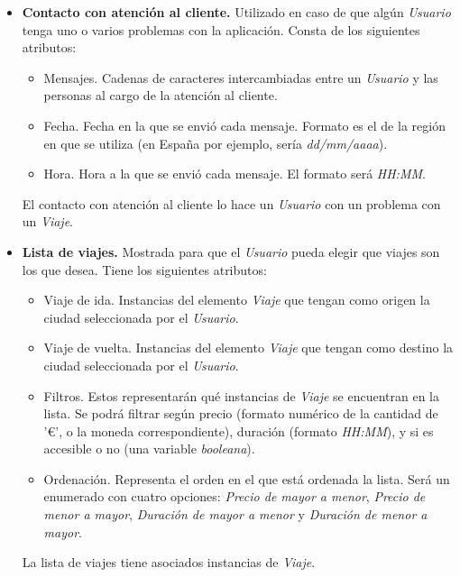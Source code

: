 \begin{itemize}
    \item \textbf{Contacto con atención al cliente.} Utilizado en caso de que algún \textit{Usuario} tenga uno o varios problemas con la aplicación. Consta
        de los siguientes atributos:
        \begin{itemize}
            \item Mensajes. Cadenas de caracteres intercambiadas entre un \textit{Usuario} y las personas al cargo de la atención al cliente.
            \item Fecha. Fecha en la que se envió cada mensaje. Formato es el de la región en que se utiliza (en España por ejemplo,
                sería \textit{dd/mm/aaaa}).
            \item Hora. Hora a la que se envió cada mensaje. El formato será \textit{HH:MM}.
        \end{itemize}

        El contacto con atención al cliente lo hace un \textit{Usuario} con un problema con un \textit{Viaje}.

    \item \textbf{Lista de viajes.} Mostrada para que el \textit{Usuario} pueda elegir que viajes son los que desea. Tiene los siguientes atributos:
        \begin{itemize}
            \item Viaje de ida. Instancias del elemento \textit{Viaje} que tengan como origen la ciudad seleccionada por el \textit{Usuario}.
            \item Viaje de vuelta. Instancias del elemento \textit{Viaje} que tengan como destino la ciudad seleccionada por el \textit{Usuario}.
            \item Filtros. Estos representarán qué instancias de \textit{Viaje} se encuentran en la lista. Se podrá filtrar según precio (formato numérico
                de la cantidad de '€', o la moneda correspondiente), duración (formato \textit{HH:MM}), y si es accesible o no (una variable \textit{booleana}).
            \item Ordenación. Representa el orden en el que está ordenada la lista. Será un enumerado con cuatro opciones: \textit{Precio de mayor a menor}, 
                \textit{Precio de menor a mayor}, \textit{Duración de mayor a menor} y \textit{Duración de menor a mayor}.
        \end{itemize}

    La lista de viajes tiene asociados instancias de \textit{Viaje}.


\end{itemize}
